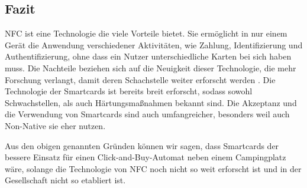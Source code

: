 
\subsection{Fazit}

NFC ist eine Technologie die viele Vorteile bietet. Sie ermöglicht in nur einem Gerät die Anwendung verschiedener
Aktivitäten, wie Zahlung, Identifizierung und Authentifizierung, ohne dass ein Nutzer unterschiedliche Karten bei
sich haben muss. Die Nachteile beziehen sich auf die Neuigkeit dieser Technologie, die mehr Forschung verlangt, 
damit deren Schachstelle weiter erforscht werden \cite{refart:ALSI}.  Die Technologie der Smartcards ist bereits
breit erforscht, sodass sowohl Schwachstellen, als auch Härtungsmaßnahmen bekannt sind. Die Akzeptanz und die 
Verwendung von Smartcards sind auch umfangreicher, besonders weil auch Non-Native sie eher nutzen.

Aus den obigen genannten Gründen können wir sagen, dass Smartcards der bessere Einsatz für einen Click-and-Buy-Automat
neben einem Campingplatz wäre, solange die Technologie von NFC noch nicht so weit erforscht ist und in der 
Gesellschaft nicht so etabliert ist.
